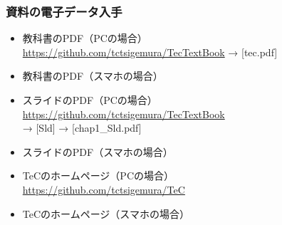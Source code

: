 \documentclass[handout]{beamer}        %
\begin{document}
\begin{frame}
  \frametitle{資料の電子データ入手}
  \begin{itemize}
  \item 教科書のPDF（PCの場合） \\
    \url{https://github.com/tctsigemura/TecTextBook} → [tec.pdf]
  \item 教科書のPDF（スマホの場合）
  \item スライドのPDF（PCの場合） \\
    \url{https://github.com/tctsigemura/TecTextBook} \\
    → [Sld] → [chap1\_Sld.pdf] \\
  \item スライドのPDF（スマホの場合）
  \item TeCのホームページ（PCの場合） \\
    \url{https://github.com/tctsigemura/TeC}
  \item TeCのホームページ（スマホの場合）
  \end{itemize}
  \vfill
\end{frame}
\end{document}

